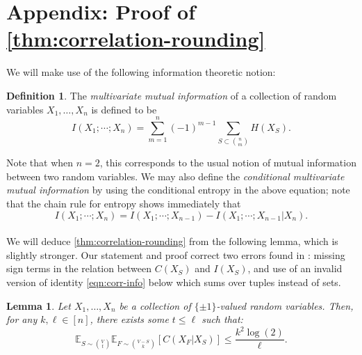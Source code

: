 \documentclass[11pt, oneside, english]{article}
\newcommand{\bE}{\mathbb{E}}
\newcommand{\E}{\bE}      %
\newtheorem{lemma}[theorem]{Lemma}
\theoremstyle{definition}
\newtheorem{definition}[theorem]{Definition}
\theoremstyle{plain}
\begin{document}
\section{Appendix: Proof of \cref{thm:correlation-rounding}}
We will make use of the following information theoretic notion:
\begin{definition}
The \emph{multivariate mutual information} of a collection of random variables $X_1,\dots,X_n$ is defined to be 
\[ I(X_1; \cdots; X_n) = \sum_{m = 1}^n (-1)^{m-1} \sum_{S \subset {n \choose m}} H(X_S). \]
\end{definition}
Note that when $n=2$, this corresponds to the usual notion of mutual information between two random variables. We may also define the \emph{conditional multivariate mutual information} by using the conditional entropy in the above equation; note that the chain rule for entropy shows immediately that 
\[ I(X_1; \cdots; X_n) = I(X_1; \cdots; X_{n - 1}) - I(X_1; \cdots; X_{n - 1} | X_n). \]
\\
\label{appendix:proof-of-corr-rounding}
We will deduce \cref{thm:correlation-rounding} from the following lemma, which is slightly stronger. Our statement and proof correct two errors found in \cite{manurangsi2017birthday,yoshida-zhou}: missing sign terms in the relation between $C(X_S)$ and $I(X_S)$, and use of an invalid version of identity \cref{eqn:corr-info} below which sums over tuples instead of sets.
\begin{lemma}\label{lem:correlation-rounding-V-S}
Let $X_1,\dots,X_n$ be a collection of $\{\pm 1\}$-valued random variables. Then, for any $k,\ell \in [n]$, there exists some $t\leq \ell$ such that:  
\[ \E_{S \sim \binom{V}{t}} \E_{F \sim \binom{V-S}{k}}[C(X_F | X_S)] \le \frac{k^2 \log(2)}{\ell}.\]
\end{lemma}
\end{document}
